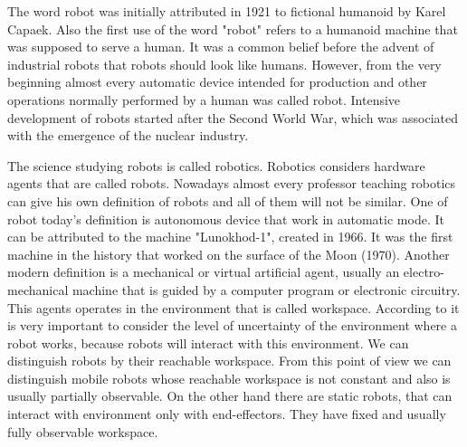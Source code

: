 \documentclass[12pt,a4paper]{report}
\begin{document}
		The word robot was initially attributed in 1921 to fictional humanoid by Karel Capaek. Also the first use of the word "robot" refers to a humanoid machine that was supposed to serve a human. It was a common belief before the advent of industrial robots that robots should look like humans. However, from the very beginning almost every automatic device intended for production and other operations normally performed by a human was called robot. Intensive development of robots started after the Second World War, which was associated with the emergence of the nuclear industry.
		
		The science studying robots is called robotics. Robotics considers hardware agents that are called robots. 		Nowadays almost every professor teaching robotics can give his own definition of robots and all of them will not be similar. One of robot today's definition is autonomous device that work in automatic mode. It can be attributed to the machine "Lunokhod-1", created in 1966. It was the first machine in the history that worked on the surface of the Moon (1970). Another modern definition is a mechanical or virtual artificial agent, usually an electro-mechanical machine that is guided by a computer program or electronic circuitry. This agents operates in the environment that is called workspace. According to \cite{pfeifer2007self} it is very important to consider the level of uncertainty of the environment where a robot works, because robots will interact with this environment. We can distinguish robots by their reachable workspace. From this point of view we can distinguish mobile robots whose reachable workspace is not constant and also is usually partially observable. On the other hand there are static robots, that can interact with environment only with end-effectors. They have fixed and usually fully observable workspace. 
		
\end{document}
